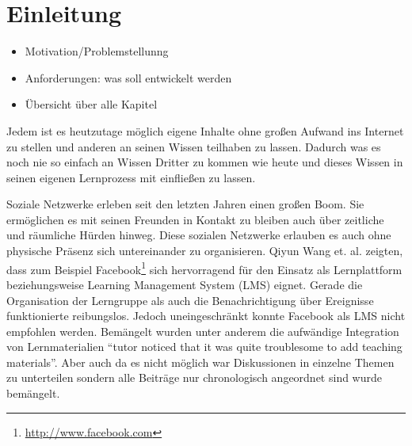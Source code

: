 
\chapter{Einleitung} %
\label{cha:einleitung}

\begin{itemize}
    \item Motivation/Problemstellunng
    \item Anforderungen: was soll entwickelt werden
    \item Übersicht über alle Kapitel
\end{itemize}



Jedem ist es heutzutage möglich eigene Inhalte ohne großen Aufwand ins Internet zu stellen und anderen an seinen Wissen teilhaben zu lassen. Dadurch was es noch nie so einfach an Wissen Dritter zu kommen wie heute und dieses Wissen in seinen eigenen Lernprozess mit einfließen zu lassen. 

\medskip

Soziale Netzwerke erleben seit den letzten Jahren einen großen Boom. Sie ermöglichen es mit seinen Freunden in Kontakt zu bleiben auch über zeitliche und räumliche Hürden hinweg. Diese sozialen Netzwerke erlauben es auch ohne physische Präsenz sich untereinander zu organisieren. Qiyun Wang et. al. \cite{Wang2012} zeigten, dass zum Beispiel Facebook\footnote{\url{http://www.facebook.com}} sich hervorragend für den Einsatz als Lernplattform beziehungsweise Learning Management System (LMS) eignet. Gerade die Organisation der Lerngruppe als auch die Benachrichtigung über Ereignisse funktionierte reibungslos. Jedoch uneingeschränkt konnte Facebook als LMS nicht empfohlen werden. Bemängelt wurden unter anderem die aufwändige Integration von Lernmaterialien \enquote{tutor noticed that it was quite troublesome to add teaching materials}\cite[S.\,435]{Wang2012}. Aber auch da es nicht möglich war Diskussionen in einzelne Themen zu unterteilen sondern alle Beiträge nur chronologisch angeordnet sind wurde bemängelt.

